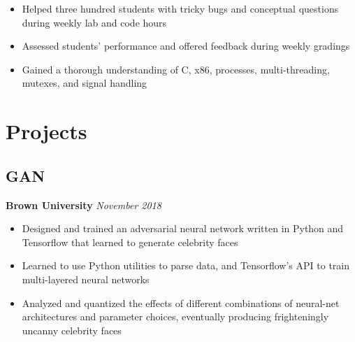 \documentclass[11pt]{article}
\begin{document}
\begin{itemize}
	\item Helped three hundred students with tricky bugs and conceptual questions during weekly lab and code hours
	\item Assessed students' performance and offered feedback during weekly gradings
	\item Gained a thorough understanding of C, x86, processes, multi-threading, mutexes, and signal handling
\end{itemize}


\section{Projects}

\subsection{GAN} 
\textbf{Brown University} \hfill \textit{November 2018}
\begin{itemize}
	\item Designed and trained an adversarial neural network written in Python and Tensorflow that learned to generate celebrity faces
	\item Learned to use Python utilities to parse data, and Tensorflow's API to train multi-layered neural networks
	\item Analyzed and quantized the effects of different combinations of neural-net architectures and parameter choices, eventually producing frighteningly uncanny celebrity faces
\end{itemize}
\end{document}
